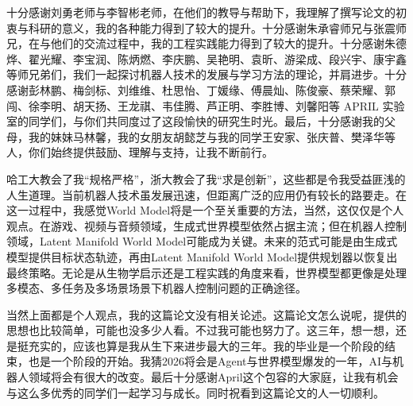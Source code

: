 \cleardoublepage
{}

十分感谢刘勇老师与李智彬老师，在他们的教导与帮助下，我理解了撰写论文的初衷与科研的意义，我的各种能力得到了较大的提升。十分感谢朱承睿师兄与张震师兄，在与他们的交流过程中，我的工程实践能力得到了较大的提升。十分感谢朱德烨、翟光耀、李宝润、陈炳燃、李庆鹏、吴艳明、袁昕、游梁成、段兴宇、康宇鑫等师兄弟们，我们一起探讨机器人技术的发展与学习方法的理论，并肩进步。十分感谢彭林鹏、梅剑标、刘维维、杜思怡、丁媛缘、傅晨灿、陈俊豪、蔡荣耀、郭闯、徐李明、胡天扬、王龙祺、韦佳腾、芦正明、李胜博、刘馨阳等 APRIL 实验室的同学们，与你们共同度过了这段愉快的研究生时光。最后，十分感谢我的父母，我的妹妹马林馨，我的女朋友胡懿芝与我的同学王安家、张庆普、樊泽华等人，你们始终提供鼓励、理解与支持，让我不断前行。

哈工大教会了我“规格严格”，浙大教会了我“求是创新”，这些都是令我受益匪浅的人生道理。当前机器人技术虽发展迅速，但距离广泛的应用仍有较长的路要走。在这一过程中，我感觉World Model将是一个至关重要的方法，当然，这仅仅是个人观点。在游戏、视频与音频领域，生成式世界模型依然占据主流；但在机器人控制领域，Latent Manifold World Model可能成为关键。未来的范式可能是由生成式模型提供目标状态轨迹，再由Latent Manifold World Model提供规划器以恢复出最终策略。无论是从生物学启示还是工程实践的角度来看，世界模型都更像是处理多模态、多任务及多场景场景下机器人控制问题的正确途径。

当然上面都是个人观点，我的这篇论文没有相关论述。这篇论文怎么说呢，提供的思想也比较简单，可能也没多少人看。不过我可能也努力了。这三年，想一想，还是挺充实的，应该也算是我从生下来进步最大的三年。我的毕业是一个阶段的结束，也是一个阶段的开始。我猜2026将会是Agent与世界模型爆发的一年，AI与机器人领域将会有很大的改变。最后十分感谢April这个包容的大家庭，让我有机会与这么多优秀的同学们一起学习与成长。同时祝看到这篇论文的人一切顺利。
